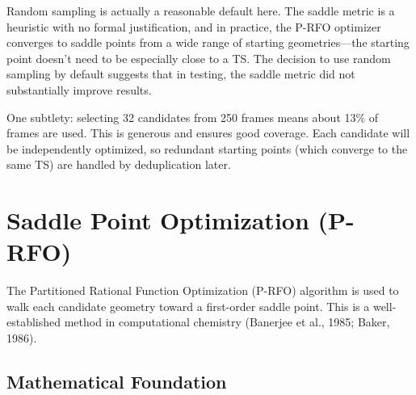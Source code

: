 \documentclass[11pt,a4paper]{article}
\begin{document}
\begin{evaluation}
Random sampling is actually a reasonable default here. The saddle metric is a heuristic with no formal justification, and in practice, the P-RFO optimizer converges to saddle points from a wide range of starting geometries---the starting point doesn't need to be especially close to a TS. The decision to use random sampling by default suggests that in testing, the saddle metric did not substantially improve results.

One subtlety: selecting 32 candidates from 250 frames means about 13\% of frames are used. This is generous and ensures good coverage. Each candidate will be independently optimized, so redundant starting points (which converge to the same TS) are handled by deduplication later.
\end{evaluation}


\section{Saddle Point Optimization (P-RFO)}
\label{sec:prfo}

The Partitioned Rational Function Optimization (P-RFO) algorithm is used to walk each candidate geometry toward a first-order saddle point. This is a well-established method in computational chemistry (Banerjee et al., 1985; Baker, 1986).

\subsection{Mathematical Foundation}
\end{document}
